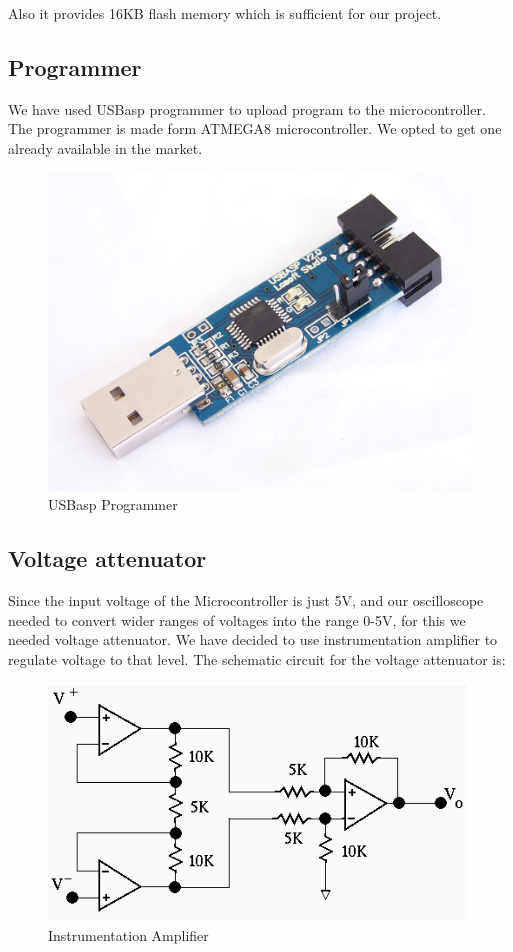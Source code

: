 \documentclass[11pt,a4paper]{article}
\begin{document}
Also it provides 16KB flash memory which is sufficient for our project.

\subsection{Programmer}
We have used USBasp programmer to upload program to the microcontroller. The programmer is made form ATMEGA8 microcontroller. We opted to get one already available in the market.
\begin{figure}[hbtp]
\centering
\includegraphics[scale=.18]{./Images/usbaspver2.jpg}
\caption{USBasp Programmer}
\end{figure}

\subsection{Voltage attenuator}
Since the input voltage of the Microcontroller is just 5V, and our oscilloscope needed to convert wider ranges of voltages into the range 0-5V, for this we needed voltage attenuator. We have decided to use instrumentation amplifier to regulate voltage to that level. The schematic circuit for the voltage attenuator is:
\begin{figure}[hbtp]
	\centering
	\includegraphics[scale=.4]{./Images/Amplifier.png}
	\caption{Instrumentation Amplifier}
\end{figure}
\end{document}
